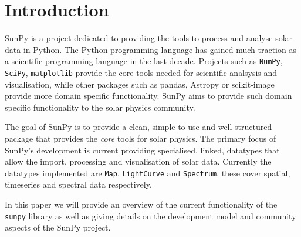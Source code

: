 \section{Introduction}
SunPy is a project dedicated to providing the tools to process and analyse 
solar data in Python.
The Python programming language has gained much traction as a scientific 
programming language in the last decade.
Projects such as \texttt{NumPy}, \texttt{SciPy}, \texttt{matplotlib} provide 
the core tools needed for scientific analsysis and visualisation, while other 
packages such as pandas, Astropy or scikit-image provide more domain specific 
functionality. SunPy aims to provide such domain specific functionality to the 
solar physics community.

The goal of SunPy is to provide a clean, simple to use and well structured 
package that provides the \textit{core} tools for solar physics.
The primary focus of SunPy's development is current providing specialised, 
linked, datatypes that allow the import, processing and visualisation of solar 
data. Currently the datatypes implemented are \texttt{Map}, \texttt{LightCurve} 
and \texttt{Spectrum}, these cover spatial, timeseries and spectral data 
respectively.

In this paper we will provide an overview of the current functionality of the 
\texttt{sunpy} library as well as giving details on the development model and 
community aspects of the SunPy project.